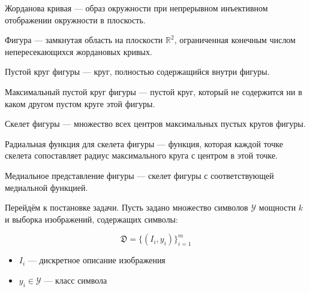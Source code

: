 \documentclass[12pt,twoside]{article}
\begin{document}
\begin{Def}
Жорданова кривая --- образ окружности при непрерывном инъективном отображении окружности в плоскость.
\end{Def}

\begin{Def}
Фигура --- замкнутая область на плоскости $\mathbb{R}^2$, ограниченная конечным числом непересекающихся жордановых кривых.
\end{Def}

\begin{Def}
Пустой круг фигуры --- круг, полностью содержащийся внутри фигуры.
\end{Def}

\begin{Def}
Максимальный пустой круг фигуры --- пустой круг, который не содержится ни в каком другом пустом круге этой фигуры.
\end{Def}

\begin{Def}
Скелет фигуры --- множество всех центров максимальных пустых кругов фигуры.
\end{Def}

\begin{Def}
Радиальная функция для скелета фигуры --- функция, которая каждой точке скелета сопоставляет радиус максимального круга с центром в этой точке.
\end{Def}

\begin{Def}
Медиальное представление фигуры --- скелет фигуры с соответствующей медиальной функцией.
\end{Def}


Перейдём к постановке задачи. Пусть задано множество символов $\mathcal{Y}$ мощности $k$ и выборка изображений, содержащих символы:

$$\mathfrak{D}=\{(I_i,y_i)\}_{i=1}^m$$

\begin{itemize}
    \item $I_i$ --- дискретное описание изображения
    \item $y_i \in \mathcal{Y}$ --- класс символа
\end{itemize}
\end{document}
